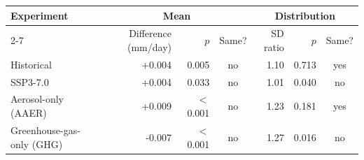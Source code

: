 %
%
%
\begin{tabular}{|l|r|r|c|r|r|c|}
\hline
\textbf{Experiment} & \multicolumn{3}{c|}{\textbf{Mean}} & \multicolumn{3}{c|}{\textbf{Distribution}} \\
\cline{2-7}
 & Difference (mm/day) & $p$ & Same? & SD ratio & $p$ & Same? \\
\hline
Historical & +0.004 & 0.005 & no & 1.10 & 0.713 & yes \\
SSP3-7.0 & +0.004 & 0.033 & no & 1.01 & 0.040 & no \\
Aerosol-only (AAER) & +0.009 & $<$0.001 & no & 1.23 & 0.181 & yes \\
Greenhouse-gas-only (GHG) & -0.007 & $<$0.001 & no & 1.27 & 0.016 & no \\
\hline
\end{tabular}
